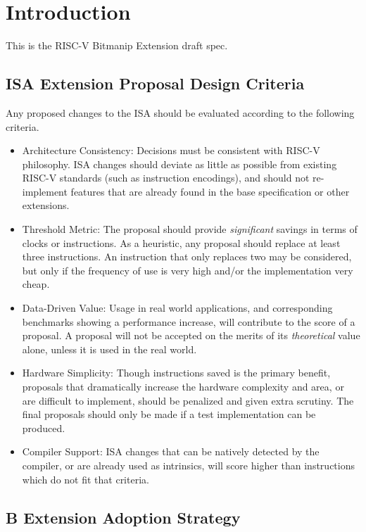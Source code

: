 \chapter{Introduction}

This is the RISC-V Bitmanip Extension draft spec. 

\section{ISA Extension Proposal Design Criteria}

Any proposed changes to the ISA should be evaluated according to the following
criteria.

\begin{itemize}
\item
  Architecture Consistency: Decisions must be consistent with RISC-V
  philosophy. ISA changes should deviate as little as possible from
  existing RISC-V standards (such as instruction encodings), and should
  not re-implement features that are already found in the base
  specification or other extensions.
\item
  Threshold Metric: The proposal should provide \emph{significant}
  savings in terms of clocks or instructions. As a heuristic, any
  proposal should replace at least three instructions. An instruction
  that only replaces two may be considered, but only if the frequency
  of use is very high and/or the implementation very cheap.
\item
  Data-Driven Value: Usage in real world applications, and corresponding
  benchmarks showing a performance increase, will contribute to the
  score of a proposal. A proposal will not be accepted on the merits of
  its \emph{theoretical} value alone, unless it is used in the real
  world.
\item
  Hardware Simplicity: Though instructions saved is the primary benefit,
  proposals that dramatically increase the hardware complexity and area,
  or are difficult to implement, should be penalized and given extra
  scrutiny. The final proposals should only be made if a test
  implementation can be produced.
\item
  Compiler Support: ISA changes that can be natively detected by the
  compiler, or are already used as intrinsics, will score higher than
  instructions which do not fit that criteria.
\end{itemize}

\section{B Extension Adoption Strategy}

